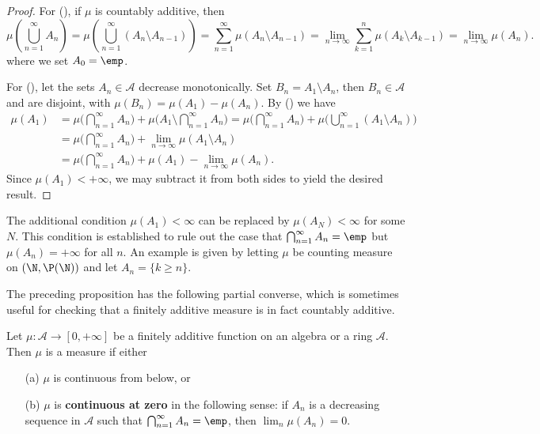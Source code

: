 \begin{proof}
For (), if $\mu$ is countably additive, then
\[\mu(\bigcup_{n=1}^{\infty}A_n)=\mu(\bigcup_{n=1}^{\infty}(A_n\setminus A_{n-1}))=\sum_{n=1}^{\infty}\mu(A_{n}\setminus A_{n-1})=\lim_{n\to\infty}\sum_{k=1}^{n}\mu(A_k\setminus A_{k-1})=\lim_{n\to\infty}\mu(A_n).\]
where we set $A_0=\emp$.\par
For (), let the sets $A_n\in\mathcal{A}$ decrease monotonically. Set $B_n=A_{1}\setminus A_{n}$, then $B_n\in\mathcal{A}$ and are disjoint, with $\mu(B_n)=\mu(A_1)-\mu(A_n)$. By () we have
\begin{align*}
\mu(A_1)&=\mu\Big(\bigcap_{n=1}^{\infty}A_n\Big)+\mu\Big(A_1\setminus\bigcap_{n=1}^{\infty}A_n\Big)=\mu\Big(\bigcap_{n=1}^{\infty}A_n\Big)+\mu\Big(\bigcup_{n=1}^{\infty}(A_1\setminus A_n)\Big)\\
&=\mu\Big(\bigcap_{n=1}^{\infty}A_n\Big)+\lim_{n\to\infty}\mu(A_1\setminus A_n)\\
&=\mu\Big(\bigcap_{n=1}^{\infty}A_n\Big)+\mu(A_1)-\lim_{n\to\infty}\mu(A_n).
\end{align*}
Since $\mu(A_1)<+\infty$, we may subtract it from both sides to yield the desired result.
\end{proof}
\begin{remark}
The additional condition $\mu(A_1)<\infty$ can be replaced by $\mu(A_N)<\infty$ for some $N$. This condition is established to rule out the case that $\bigcap_{n=1}^{\infty}A_n=\emp$ but $\mu(A_n)=+\infty$ for all $n$. An example is given by letting $\mu$ be counting measure on $(\N,\P(\N))$ and let $A_n=\{k\geq n\}$.
\end{remark}
The preceding proposition has the following partial converse, which is sometimes useful for checking that a finitely additive measure is in fact countably additive.
\begin{proposition}\label{measure add is sigma-add iff}
Let $\mu:\mathcal{A}\to[0,+\infty]$ be a finitely additive function on an algebra or a ring $\mathcal{A}$. Then $\mu$ is a measure if either
\begin{itemize}
\item[(a)] $\mu$ is continuous from below, or
\item[(b)] $\mu$ is \textbf{continuous at zero} in the following sense: if $A_n$ is a decreasing sequence in $\mathcal{A}$ such that $\bigcap_{n=1}^{\infty}A_n=\emp$, then $\lim_n\mu(A_n)=0$.
\end{itemize}
\end{proposition}
